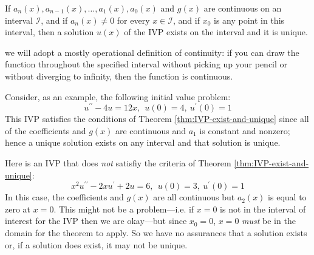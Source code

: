 \begin{theorem}
If $a_n(x),a_{n-1}(x),\dots,a_1(x),a_0(x)$ and $g(x)$ are continuous on an interval $\mathcal{I}$, and if $a_n(x) \ne 0$ for every $x \in \mathcal{I}$, and if $x_0$ is any point in this interval, then a solution $u(x)$ of the IVP exists on the interval and it is unique.
\label{thm:IVP-exist-and-unique}
\end{theorem}
 we will adopt a mostly operational definition of continuity: if you can draw the function throughout the specified interval without picking up your pencil or without diverging to infinity, then the function is continuous.  

Consider, as an example, the following initial value problem:
\begin{equation}
u^{\prime \prime}-4u = 12x, \ \ u(0)=4, \ u^{\prime}(0)=1
\end{equation}
This IVP satisfies the conditions of Theorem \ref{thm:IVP-exist-and-unique} since all of the coefficients and $g(x)$ are continuous and $a_1$ is constant and nonzero; hence a unique solution exists on any interval and that solution is unique.

Here is an IVP that does \emph{not} satisfiy the criteria of Theorem \ref{thm:IVP-exist-and-unique}:
\begin{equation}
x^2u^{\prime \prime} - 2xu^{\prime}+2u=6, \ \ u(0)=3, \ u^{\prime}(0)=1
\end{equation}
\noindent In this case, the coefficients and $g(x)$ are all continuous but $a_2(x)$ is equal to zero at $x=0$.  This might not be a problem---i.e. if $x=0$ is not in the interval of interest for the IVP then we are okay---but since $x_0=0$, $x=0$ \emph{must} be in the domain for the theorem to apply.  So we have no assurances that a solution exists or, if a solution does exist, it may not be unique.

